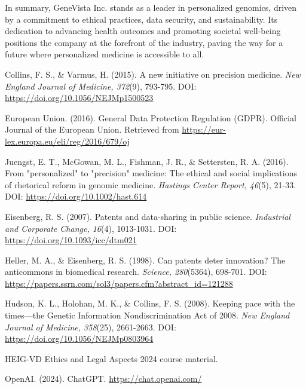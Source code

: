 \documentclass[a4paper]{article}
\begin{document}
In summary, GeneVista Inc. stands as a leader in personalized genomics, driven by a commitment to ethical practices, data security, and sustainability. Its dedication to advancing health outcomes and promoting societal well-being positions the company at the forefront of the industry, paving the way for a future where personalized medicine is accessible to all.

\begin{thebibliography}{9}

Collins, F. S., \& Varmus, H. (2015). A new initiative on precision medicine. \textit{New England Journal of Medicine, 372}(9), 793-795. DOI: \url{https://doi.org/10.1056/NEJMp1500523}

European Union. (2016). General Data Protection Regulation (GDPR). Official Journal of the European Union. Retrieved from \url{https://eur-lex.europa.eu/eli/reg/2016/679/oj}

Juengst, E. T., McGowan, M. L., Fishman, J. R., \& Settersten, R. A. (2016). From "personalized" to "precision" medicine: The ethical and social implications of rhetorical reform in genomic medicine. \textit{Hastings Center Report, 46}(5), 21-33. DOI: \url{https://doi.org/10.1002/hast.614}

Eisenberg, R. S. (2007). Patents and data-sharing in public science. \textit{Industrial and Corporate Change, 16}(4), 1013-1031. DOI: \url{https://doi.org/10.1093/icc/dtm021}

Heller, M. A., \& Eisenberg, R. S. (1998). Can patents deter innovation? The anticommons in biomedical research. \textit{Science, 280}(5364), 698-701. DOI: \url{https://papers.ssrn.com/sol3/papers.cfm?abstract_id=121288}

Hudson, K. L., Holohan, M. K., \& Collins, F. S. (2008). Keeping pace with the times—the Genetic Information Nondiscrimination Act of 2008. \textit{New England Journal of Medicine, 358}(25), 2661-2663. DOI: \url{https://doi.org/10.1056/NEJMp0803964}

HEIG-VD Ethics and Legal Aspects 2024 course material.

OpenAI. (2024). ChatGPT. \url{https://chat.openai.com/}

\end{thebibliography}
\end{document}
